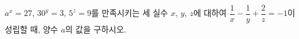 $a^x=27$, $30^y=3$, $5^z=9$를 만족시키는 세 실수 $x$, $y$, $z$에 대하여 $\dfrac{1}{x}-\dfrac{1}{y}+\dfrac{2}{z}=-1$이 성립할 때, 양수 $a$의 값을 구하시오.
